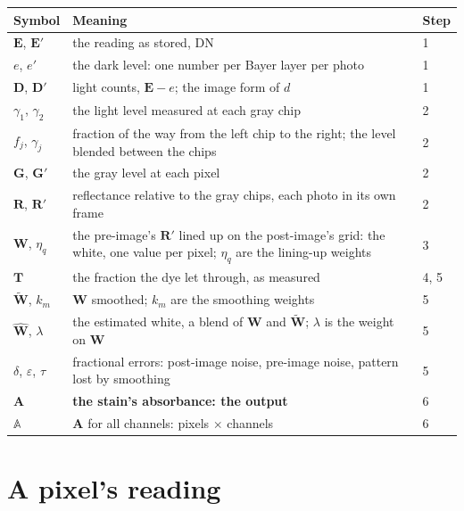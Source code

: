 \documentclass[11pt,letter]{article}
\newcommand{\iE}{\mathbf{E}}   %
\newcommand{\iD}{\mathbf{D}}   %
\newcommand{\iG}{\mathbf{G}}   %
\newcommand{\iR}{\mathbf{R}}   %
\newcommand{\iW}{\mathbf{W}}   %
\newcommand{\tW}{\widetilde{\mathbf{W}}}   %
\newcommand{\hW}{\widehat{\mathbf{W}}}     %
\newcommand{\iT}{\mathbf{T}}   %
\newcommand{\iA}{\mathbf{A}}   %
\newcommand{\tblA}{\mathbb{A}} %
\begin{document}
\begin{tabular}{@{}L{3.4cm}L{9.6cm}L{1.6cm}@{}}
\toprule
Symbol & Meaning & Step \\
\midrule
$\iE$, $\iE'$ & the reading as stored, DN & 1 \\
$e$, $e'$ & the dark level: one number per Bayer layer per photo & 1 \\
$\iD$, $\iD'$ & light counts, $\iE - e$; the image form of $d$ & 1 \\
$\gamma_1$, $\gamma_2$ & the light level measured at each gray chip & 2 \\
$f_j$, $\gamma_j$ & fraction of the way from the left chip to the right;
  the level blended between the chips & 2 \\
$\iG$, $\iG'$ & the gray level at each pixel & 2 \\
$\iR$, $\iR'$ & reflectance relative to the gray chips, each photo in its
  own frame & 2 \\
$\iW$, $\eta_q$ & the pre-image's $\iR'$ lined up on the post-image's
  grid: the white, one value per pixel; $\eta_q$ are the lining-up weights
  & 3 \\
$\iT$ & the fraction the dye let through, as measured & 4, 5 \\
$\tW$, $k_m$ & $\iW$ smoothed; $k_m$ are the smoothing weights & 5 \\
$\hW$, $\lambda$ & the estimated white, a blend of $\iW$ and $\tW$;
  $\lambda$ is the weight on $\iW$ & 5 \\
$\delta$, $\varepsilon$, $\tau$ & fractional errors: post-image noise,
  pre-image noise, pattern lost by smoothing & 5 \\
$\iA$ & \textbf{the stain's absorbance: the output} & 6 \\
$\tblA$ & $\iA$ for all channels: pixels $\times$ channels & 6 \\
\bottomrule
\end{tabular}

\section{A pixel's reading}
\label{sec:model}
\end{document}
